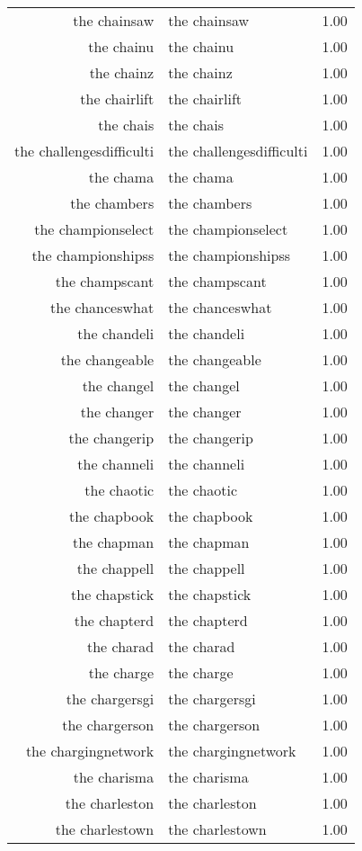 \begin{table}[ht]
\begin{tabular}{rlr}
  the chainsaw & the chainsaw & 1.00 \\ 
  the chainu & the chainu & 1.00 \\ 
  the chainz & the chainz & 1.00 \\ 
  the chairlift & the chairlift & 1.00 \\ 
  the chais & the chais & 1.00 \\ 
  the challengesdifficulti & the challengesdifficulti & 1.00 \\ 
  the chama & the chama & 1.00 \\ 
  the chambers & the chambers & 1.00 \\ 
  the championselect & the championselect & 1.00 \\ 
  the championshipss & the championshipss & 1.00 \\ 
  the champscant & the champscant & 1.00 \\ 
  the chanceswhat & the chanceswhat & 1.00 \\ 
  the chandeli & the chandeli & 1.00 \\ 
  the changeable & the changeable & 1.00 \\ 
  the changel & the changel & 1.00 \\ 
  the changer & the changer & 1.00 \\ 
  the changerip & the changerip & 1.00 \\ 
  the channeli & the channeli & 1.00 \\ 
  the chaotic & the chaotic & 1.00 \\ 
  the chapbook & the chapbook & 1.00 \\ 
  the chapman & the chapman & 1.00 \\ 
  the chappell & the chappell & 1.00 \\ 
  the chapstick & the chapstick & 1.00 \\ 
  the chapterd & the chapterd & 1.00 \\ 
  the charad & the charad & 1.00 \\ 
  the charge & the charge & 1.00 \\ 
  the chargersgi & the chargersgi & 1.00 \\ 
  the chargerson & the chargerson & 1.00 \\ 
  the chargingnetwork & the chargingnetwork & 1.00 \\ 
  the charisma & the charisma & 1.00 \\ 
  the charleston & the charleston & 1.00 \\ 
  the charlestown & the charlestown & 1.00 \\ 

\end{tabular}
\end{table}

